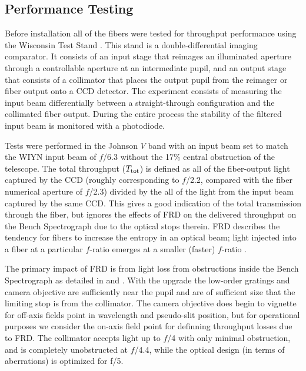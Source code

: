 \begin{appendices}

\setcounter{table}{0}
\renewcommand{\thetable}{\Alph{section}\arabic{table}}
\setcounter{figure}{0}
\renewcommand{\thefigure}{\Alph{section}\arabic{figure}}

\section{\GP Performance Testing}
\label{sec:GPtesting}



Before installation all of the \GP fibers were tested for throughput
performance using the Wisconsin Test Stand
\citep{Bershady04,Crause08,Eigenbrot12}. This stand is a
double-differential imaging comparator. It consists of an input stage
that reimages an illuminated aperture through a controllable aperture
at an intermediate pupil, and an output stage that consists of a
collimator that places the output pupil from the reimager or fiber
output onto a CCD detector. The experiment consists of measuring the
input beam differentially between a straight-through configuration and
the collimated fiber output. During the entire process the stability
of the filtered input beam is monitored with a photodiode.

Tests were performed in the Johnson $V$ band with an input beam set to
match the WIYN input beam of $f$/6.3 without the 17\% central
obstruction of the telescope. The total throughput ($T_{\rm tot}$) is
defined as all of the fiber-output light captured by the CCD (roughly
corresponding to $f$/2.2, compared with the fiber numerical aperture
of $f$/2.3)
divided by the all of the light from the input beam captured by the
same CCD. This gives a good indication of the total transmission
through the fiber, but ignores the effects of FRD on the delivered
throughput on the Bench Spectrograph due to the optical stops
therein. FRD describes the tendency for fibers to increase the entropy
in an optical beam; light injected into a fiber at a particular
$f$-ratio emerges at a smaller (faster) $f$-ratio \citep{Angel77}.

The primary impact of FRD is from light loss from obstructions inside
the Bench Spectrograph as detailed in \cite{Bershady04} and
\cite{Bershady05}.  With the upgrade \citep{Bershady08} the low-order
gratings and camera objective are sufficiently near the pupil and are
of sufficient size that the limiting stop is from the collimator. The
camera objective does begin to vignette for off-axis fields point in
wavelength and pseudo-slit position, but for operational purposes we
consider the on-axis field point for definning throughput losses due
to FRD.  The collimator accepts light up to $f$/4 with only minimal
obstruction, and is completely unobstructed at $f$/4.4, while the
optical design (in terms of aberrations) is optimized for f/5.


\end{appendices}
